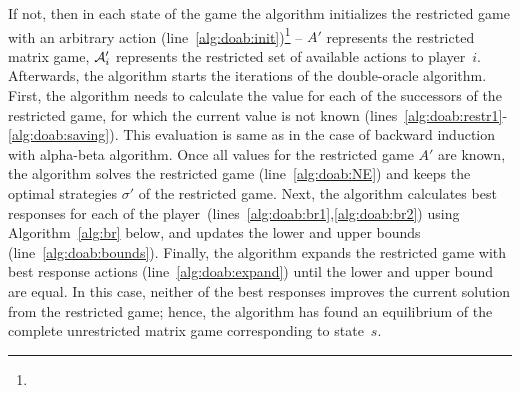 If not, then in each state of the game the algorithm initializes the restricted game with an arbitrary action (line~\ref{alg:doab:init})\footnote{} -- $A'$ represents the restricted matrix game, $\mathcal{A}'_i$ represents the restricted set of available actions to player~$i$.
Afterwards, the algorithm starts the iterations of the double-oracle algorithm.
First, the algorithm needs to calculate the value for each of the successors of the restricted game, for which the current value is not known (lines~\ref{alg:doab:restr1}-\ref{alg:doab:saving}). This evaluation is same as in the case of backward induction with alpha-beta algorithm.
Once all values for the restricted game $A'$ are known, the algorithm solves the restricted game (line~\ref{alg:doab:NE}) and keeps the optimal strategies $\sigma'$ of the restricted game.
Next, the algorithm calculates best responses for each of the player~(lines~\ref{alg:doab:br1},\ref{alg:doab:br2}) using Algorithm~\ref{alg:br} below, and updates the lower and upper bounds (line~\ref{alg:doab:bounds}). Finally, the algorithm expands the restricted game with best response actions (line~\ref{alg:doab:expand}) until the lower and upper bound are equal. In this case, neither of the best responses improves the current solution from the restricted game; hence, the algorithm has found an equilibrium of the complete unrestricted matrix game corresponding to state~$s$.

